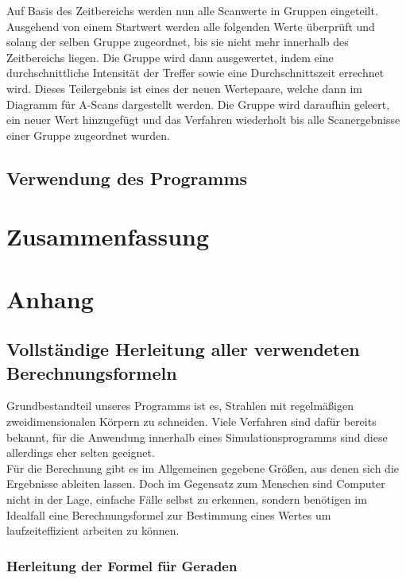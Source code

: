 \documentclass[reducespace,stylepage,semiarbeit]{spezidoc}
\begin{document}
Auf Basis des Zeitbereichs werden nun alle Scanwerte in Gruppen eingeteilt. 
Ausgehend von einem Startwert werden alle folgenden Werte überprüft und solang der selben Gruppe zugeordnet, bis sie nicht mehr innerhalb des Zeitbereichs liegen. 
Die Gruppe wird dann ausgewertet, indem eine durchschnittliche Intensität der Treffer sowie eine Durchschnittszeit errechnet wird. 
Dieses Teilergebnis ist eines der neuen Wertepaare, welche dann im Diagramm für A-Scans dargestellt werden. 
Die Gruppe wird daraufhin geleert, ein neuer Wert hinzugefügt und das Verfahren wiederholt bis alle Scanergebnisse einer Gruppe zugeordnet wurden.


\subsection{Verwendung des Programms} %


\newpage
\section{Zusammenfassung}



\newpage
\section{Anhang}

\subsection{Vollständige Herleitung aller verwendeten Berechnungsformeln}
Grundbestandteil unseres Programms ist es, Strahlen mit regelmäßigen zweidimensionalen Körpern zu schneiden. Viele Verfahren sind dafür bereits bekannt, für die Anwendung innerhalb eines Simulationsprogramms sind diese allerdings eher selten geeignet.\\
Für die Berechnung gibt es im Allgemeinen gegebene Größen, aus denen sich die Ergebnisse ableiten lassen. Doch im Gegensatz zum Menschen sind Computer nicht in der Lage, einfache Fälle selbst zu erkennen, sondern benötigen im Idealfall eine Berechnungsformel zur Bestimmung eines Wertes um laufzeiteffizient arbeiten zu können.

\subsubsection*{Herleitung der Formel für Geraden}
\end{document}
